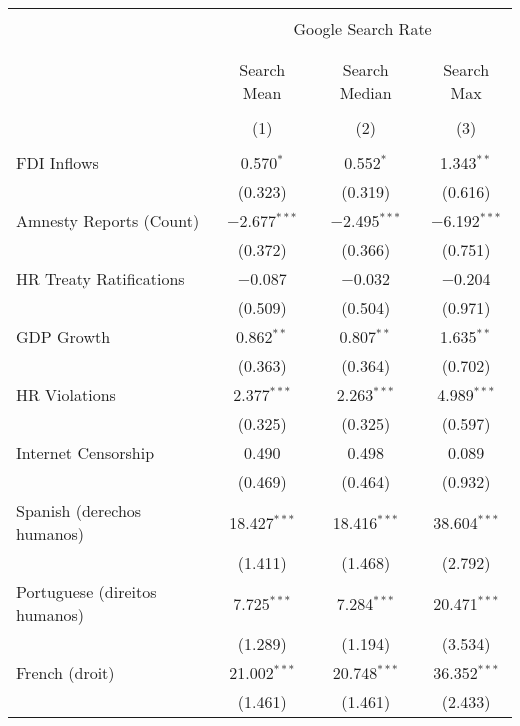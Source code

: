 
\begin{table}[!htbp] \centering 
  \caption{} 
  \label{} 
\begin{tabular}{@{\extracolsep{5pt}}lccc} 
\\[-1.8ex]\hline 
\hline \\[-1.8ex] 
 & \multicolumn{3}{c}{Google Search Rate} \\ 
\cline{2-4} 
\\[-1.8ex] & \multicolumn{3}{c}{ } \\ 
 & Search Mean & Search Median & Search Max \\ 
\\[-1.8ex] & (1) & (2) & (3)\\ 
\hline \\[-1.8ex] 
 FDI Inflows & 0.570$^{*}$ & 0.552$^{*}$ & 1.343$^{**}$ \\ 
  & (0.323) & (0.319) & (0.616) \\ 
  Amnesty Reports (Count) & $-$2.677$^{***}$ & $-$2.495$^{***}$ & $-$6.192$^{***}$ \\ 
  & (0.372) & (0.366) & (0.751) \\ 
  HR Treaty Ratifications & $-$0.087 & $-$0.032 & $-$0.204 \\ 
  & (0.509) & (0.504) & (0.971) \\ 
  GDP Growth & 0.862$^{**}$ & 0.807$^{**}$ & 1.635$^{**}$ \\ 
  & (0.363) & (0.364) & (0.702) \\ 
  HR Violations & 2.377$^{***}$ & 2.263$^{***}$ & 4.989$^{***}$ \\ 
  & (0.325) & (0.325) & (0.597) \\ 
  Internet Censorship & 0.490 & 0.498 & 0.089 \\ 
  & (0.469) & (0.464) & (0.932) \\ 
  Spanish (derechos humanos) & 18.427$^{***}$ & 18.416$^{***}$ & 38.604$^{***}$ \\ 
  & (1.411) & (1.468) & (2.792) \\ 
  Portuguese (direitos humanos) & 7.725$^{***}$ & 7.284$^{***}$ & 20.471$^{***}$ \\ 
  & (1.289) & (1.194) & (3.534) \\ 
  French (droit) & 21.002$^{***}$ & 20.748$^{***}$ & 36.352$^{***}$ \\ 
  & (1.461) & (1.461) & (2.433) \\ 

\end{tabular}
\end{table}
